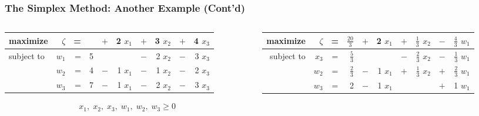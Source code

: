 \documentclass[usenames,dvipsnames,8pt]{beamer}%
\begin{document}
\begin{frame}
  \frametitle{The Simplex Method: Another Example (Cont'd)}
  \begin{columns}
    \begin{column}{0.5\textwidth}
      \begin{table}[ht]
        \centering
        \setlength\tabcolsep{2pt}
        \begin{tabular}{lrrrcrcrcr}
          \toprule
          maximize   &$\zeta$& = &   & $+$ & 2 $x_1$ & $+$ & 3 $x_2$ &\cellcolor{C2}\color{white}  $+$ &\cellcolor{C2}\color{white}  4 $x_3$ \\
          \midrule
          subject to & $w_1$ & = & 5 &  &  & $-$ & 2 $x_2$ & $-$ & 3 $x_3$ \\
                     & $w_2$ & = & 4 & $-$ & 1 $x_1$ & $-$ & 1 $x_2$ & $-$ & 2 $x_3$ \\
                     & $w_3$ & = & 7 & $-$ & 1 $x_1$ & $-$ & 2 $x_2$ & $-$ & 3 $x_3$ \\ 
          \bottomrule
        \end{tabular}
      \end{table}
      \vspace{-0.4cm}
      \begin{align*}
        x_1,\;x_2,\;x_3,\;w_1,\;w_2,\;w_3\geqslant 0
      \end{align*}
    \end{column}
    \begin{column}{0.5\textwidth}
      \begin{table}[ht]
        \centering
        \setlength\tabcolsep{2pt}
        \begin{tabular}{rrcrcrcrcr}
          \toprule
          maximize   &$\zeta$& = & $\frac{20}{3}$ & $+$ & 2 $x_1$ & $+$ & $\frac{1}{3}$ $x_2$ & $-$ & $\frac{4}{3}$ $w_1$ \\
          \midrule
          subject to & $x_3$ & = & $\frac{5}{3}$ &     &           & $-$ & $\frac{2}{3}$ $x_2$ & $-$ & $\frac{1}{3}$ $w_1$ \\ 
                     & $w_2$ & = & $\frac{2}{3}$ & $-$ & 1   $x_1$ & $+$ & $\frac{1}{3}$ $x_2$ & $+$ & $\frac{2}{3}$ $w_1$ \\
                     & $w_3$ & = & 2 & $-$ & 1 $x_1$ &  &  & $+$ & 1 $w_1$ \\
          \bottomrule
        \end{tabular}
      \end{table}
      \vspace{-0.4cm}
      \begin{align*}

\end{align*}
\end{column}
\end{columns}
\end{frame}
\end{document}
